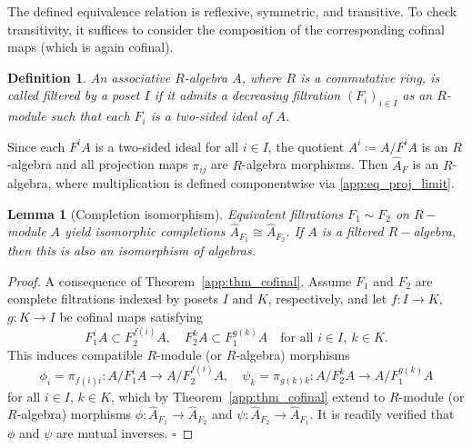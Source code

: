 \documentclass[a4paper,12pt]{amsart}
\newtheorem{deff}{Definition}
\newtheorem{lemma}{Lemma}
\begin{document}
\noindent The defined equivalence relation is reflexive, symmetric, and transitive. To check transitivity, it suffices to consider the composition of the corresponding cofinal maps (which is again cofinal).

\begin{deff}\label{app:def_filtered_algebra}\normalfont
    An associative $R$-algebra $A$, where $R$ is a commutative ring, is called \emph{filtered by a poset $I$} if it admits a decreasing filtration $(F_i)_{i\in I}$ as an $R$-module such that each $F_i$ is a two-sided ideal of $A$.
\end{deff}

\noindent Since each $F^i A$ is a two-sided ideal for all $i\in I$, the quotient $A^i \coloneqq A/F^i A$ is an $R$-algebra and all projection maps $\pi_{ij}$ are $R$-algebra morphisms. Then $\hat{A}_F$ is an $R$-algebra, where multiplication is defined componentwise via \eqref{app:eq_proj_limit}.



\begin{lemma}[Completion isomorphism]\label{app:lem_iso_compl}\normalfont
Equivalent filtrations $F_1\sim F_2$ on $R-$module $A$ yield isomorphic completions $\hat{A}_{F_1}\cong\hat{A}_{F_2}$. If $A$ is a filtered $R-$algebra, then this is also an isomorphism of algebras. 
\end{lemma}

\noindent\begin{proof}
A consequence of Theorem~\ref{app:thm_cofinal}. Assume $F_1$ and $F_2$ are complete filtrations indexed by posets $I$ and $K$, respectively, and let $f\colon I\to K$, $g\colon K\to I$ be cofinal maps satisfying
\[
F_1^i A \subset F_2^{f(i)} A, \quad F_2^k A \subset F_1^{g(k)} A \quad \text{for all } i\in I,\ k\in K.
\]
This induces compatible $R$-module (or $R$-algebra) morphisms
\[
\phi_i = \pi_{f(i)i} \colon A/F_1^i A \to A/F_2^{f(i)} A, \quad \psi_k = \pi_{g(k)k} \colon A/F_2^k A \to A/F_1^{g(k)} A
\]
for all $i\in I$, $k\in K$, which by Theorem~\ref{app:thm_cofinal} extend to $R$-module (or $R$-algebra) morphisms $\phi\colon \hat{A}_{F_1}\to \hat{A}_{F_2}$ and $\psi\colon \hat{A}_{F_2}\to \hat{A}_{F_1}$. It is readily verified that $\phi$ and $\psi$ are mutual inverses. $\square$
\end{proof}
\end{document}
